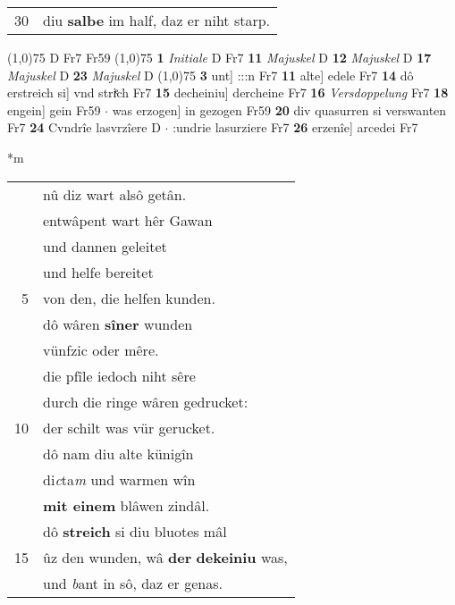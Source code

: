 \documentclass[8pt,a4paper,notitlepage]{article}
\begin{document}
\begin{table}[ht]
\begin{minipage}[t]{0.5\linewidth}
\begin{tabular}{rl}
30 & diu \textbf{salbe} im half, daz er niht starp.\\ 
\end{tabular}
\scriptsize
\line(1,0){75} \newline
D Fr7 Fr59 \newline
\line(1,0){75} \newline
\textbf{1} \textit{Initiale} D Fr7  \textbf{11} \textit{Majuskel} D  \textbf{12} \textit{Majuskel} D  \textbf{17} \textit{Majuskel} D  \textbf{23} \textit{Majuskel} D  \newline
\line(1,0){75} \newline
\textbf{3} unt] :::n Fr7 \textbf{11} alte] edele Fr7 \textbf{14} dô erstreich si] vnd striͤch Fr7 \textbf{15} decheiniu] dercheine Fr7 \textbf{16} \textit{Versdoppelung} Fr7  \textbf{18} engein] gein Fr59  $\cdot$ was erzogen] in gezogen Fr59 \textbf{20} div quasurren si verswanten Fr7 \textbf{24} Cvndrîe lasvrzîere D  $\cdot$ :undrie lasurziere Fr7 \textbf{26} erzenîe] arcedei Fr7 \newline
\end{minipage}
\hspace{0.5cm}
\begin{minipage}[t]{0.5\linewidth}
\small
\begin{center}*m
\end{center}
\begin{tabular}{rl}
 & nû diz wart alsô getân.\\ 
 & entwâpent wart hêr Gawan\\ 
 & und dannen geleitet\\ 
 & und helfe bereitet\\ 
5 & von den, die helfen kunden.\\ 
 & dô wâren \textbf{sîner} wunden\\ 
 & vünfzic oder mêre.\\ 
 & die pfîle iedoch niht sêre\\ 
 & durch die ringe wâren gedrucket:\\ 
10 & der schilt was vür gerucket.\\ 
 & dô nam diu alte künigîn\\ 
 & di\textit{c}ta\textit{m} und warmen wîn\\ 
 & \textbf{mit einem} blâwen zindâl.\\ 
 & dô \textbf{streich} si diu bluotes mâl\\ 
15 & ûz den wunden, wâ \textbf{der} \textbf{dekeiniu} was,\\ 
 & und \textit{b}ant in sô, daz er genas.\\ 

\end{tabular}
\end{minipage}
\end{table}
\end{document}
